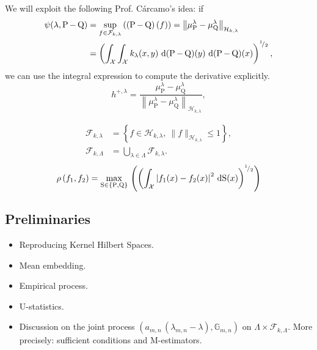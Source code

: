 	We will exploit the following Prof. C\'{a}rcamo's idea: if
	\begin{equation}\label{Eqn:ProfCarcaIdea}
		\begin{aligned}
			\psi(\lambda,\operatorname{P}-\operatorname{Q})&=\underset{f\in\mathcal{F}_{k,\lambda}}{\operatorname{sup}}\,((\operatorname{P}-\operatorname{Q})\,(f))=\left\|\mu_{\operatorname{P}}^{\lambda}-\mu_{\operatorname{Q}}^{\lambda}\right\|_{\mathcal{H}_{k,\lambda}}
			\\&=\left(\int_{\mathcal{X}}\int_{\mathcal{X}}k_{\lambda}(x,y)\,\operatorname{d}(\operatorname{P}-\operatorname{Q})(y)\,\operatorname{d}(\operatorname{P}-\operatorname{Q})(x)\right)^{^{1}\!/_{2}},
		\end{aligned}
	\end{equation}
	we can use the integral expression to compute the derivative explicitly.
	\begin{equation}\label{Eqn:Witness}
		h^{+,\lambda}=\frac{\mu_{\operatorname{P}}^{\lambda}-\mu_{\operatorname{Q}}^{\lambda}}{\left\|\mu_{\operatorname{P}}^{\lambda}-\mu_{\operatorname{Q}}^{\lambda}\right\|_{\mathcal{H}_{k,\lambda}}},
	\end{equation}
	
	
	
	\begin{equation}\label{Eqn:Lambda_union_unit-ball}
		\begin{aligned}
			\mathcal{F}_{k,\lambda}&=\left\{f\in\mathcal{H}_{k,\lambda},\ \|f\|_{\mathcal{H}_{k,\lambda}}\leq1\right\},
			\\
			\mathcal{F}_{k,\Lambda}&=\bigcup_{\lambda\in \Lambda}  \mathcal{F}_{k,\lambda}.
		\end{aligned}
	\end{equation}
	\begin{equation}
		\rho\left(f_{1},f_{2}\right)=\underset{\operatorname{S}\in\{\operatorname{P},\operatorname{Q}\}}{\operatorname{max}}\,\left(\left(\int_{\mathcal{X}}\left|f_{1}(x)-f_{2}(x)\right|^{2}\,\operatorname{d}\!\operatorname{S}(x)\right)^{^{1}\!/_{2}}\right)
	\end{equation}
	\subsection{Preliminaries}
		\begin{itemize}
			\item Reproducing Kernel Hilbert Spaces.
			\item Mean embedding.
			\item Empirical process.
			\item U-statistics.
			\item Discussion on the joint process $\left(a_{m,n}\,\left(\lambda_{m,n}-\lambda\right),\mathbb{G}_{m,n}\right)$ on $\Lambda\times\mathcal{F}_{k,\Lambda}$. More precisely: sufficient conditions and M-estimators.
		\end{itemize}
